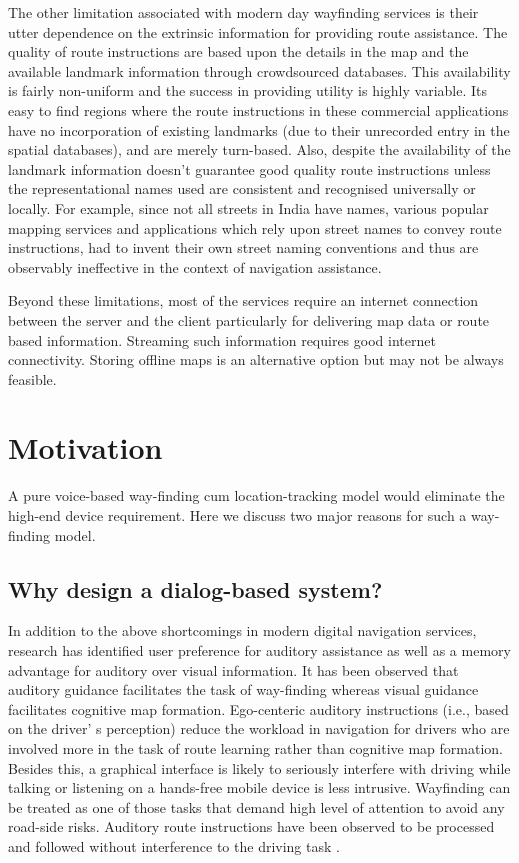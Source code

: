 \documentclass{iitkthesis}
\begin{document}
The other limitation associated with modern day wayfinding services is 
their utter dependence on the extrinsic information for providing route 
assistance. The quality of route instructions are based upon the details 
in the map and the available landmark information through crowdsourced 
databases. This availability is fairly non-uniform and the success in 
providing utility is highly variable. Its easy to find regions where the 
route instructions in these commercial applications have no incorporation 
of existing landmarks (due to their unrecorded entry in the spatial 
databases), and are merely turn-based. Also, despite the availability of 
the landmark information doesn't guarantee good quality route 
instructions unless the representational names used are consistent and 
recognised universally or locally. For example, since not all streets in 
India have names, various popular mapping services and applications which 
rely upon street names to convey route instructions, had to invent their 
own street naming conventions and thus are observably ineffective in the 
context of navigation assistance.

Beyond these limitations, most of the services require an internet 
connection between the server and the client particularly for 
delivering map data or route based information. Streaming such  
information requires good internet connectivity. Storing offline maps is 
an alternative option but may not be always feasible.   

\section{Motivation}
A pure voice-based way-finding cum location-tracking 
model would eliminate the high-end device requirement. Here we discuss two
major reasons for such a way-finding model. 
\subsection{Why design a dialog-based system?}
In addition to the above shortcomings in modern digital navigation 
services, research \cite{jensen2010,dalton,reagan2006} has 
identified user preference for auditory assistance as well as a memory 
advantage for auditory over visual information. It has been observed 
\cite{baldwin2009,furukawa2004} that auditory guidance facilitates the 
task of way-finding whereas visual guidance facilitates cognitive map 
formation. Ego-centeric auditory instructions (i.e., based on the driver'
s perception) reduce the workload in navigation for drivers who are 
involved more in the task of route learning rather than cognitive map 
formation. Besides this, a graphical interface is likely to seriously 
interfere with driving while talking or listening on a hands-free mobile 
device is less intrusive. Wayfinding 
can be treated as one of those tasks that demand high level of attention 
to avoid any road-side risks. Auditory route instructions have been 
observed to be processed and followed without interference to the driving 
task \cite{jensen2010,dalton}.
\end{document}
